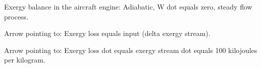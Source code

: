 Exergy balance in the aircraft engine:  
Adiabatic, W dot equals zero, steady flow process.  

Arrow pointing to:  
Exergy loss equals input (delta exergy stream).  

Arrow pointing to:  
Exergy loss dot equals exergy stream dot equals 100 kilojoules per kilogram.